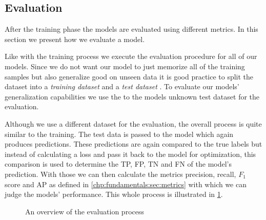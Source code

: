 \subsection{Evaluation}
\label{chp:study:sec:design:subsec:evaluation}
After the training phase the models are evaluated using different metrics.
In this section we present how we evaluate a model.

Like with the training process we execute the evaluation procedure for all of our models.
Since we do not want our model to just memorize all of the training samples but also generalize good on unseen data it is good practice to split the dataset into a \textit{training dataset} and a \textit{test dataset} \parencite{Reitermanova:2010}.
To evaluate our models' generalization capabilities we use the to the models unknown test dataset for the evaluation.

Although we use a different dataset for the evaluation, the overall process is quite similar to the training.
The test data is passed to the model which again produces predictions.
These predictions are again compared to the true labels but instead of calculating a loss and pass it back to the model for optimization, this comparison is used to determine the \ac{TP}, \ac{FP}, \ac{TN} and \ac{FN} of the model's prediction.
With those we can then calculate the metrics precision, recall, $F_1$ score and \ac{AP} as defined in \cref{chp:fundamentals:sec:metrics} with which we can judge the models' performance.
This whole process is illustrated in \cref{fig:study:design:evaluation}.

\newpage
\begin{figure}[htpb]
    \centering
    \def\svgwidth{\columnwidth}
    
    \caption[Study Design: Evaluation]{An overview of the evaluation process}\label{fig:study:design:evaluation}
\end{figure}
